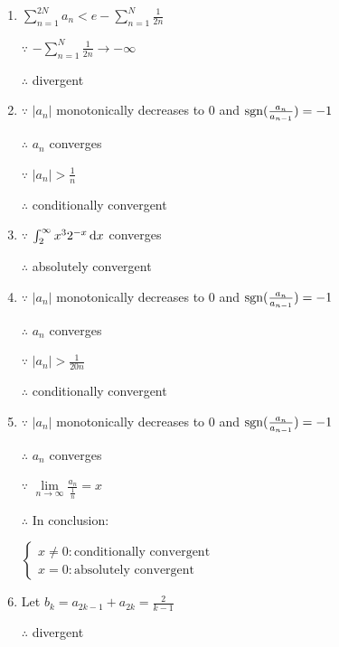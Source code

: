 \begin{enumerate}[1]
\begin{enumerate}[(1)]
     \item
     $\sum\limits_{n=1}^{2N}a_n < e-\sum\limits_{n=1}^{N}\frac{1}{2n}$
     \par $\because$ $-\sum\limits_{n=1}^{N}\frac{1}{2n}\rightarrow -\infty$
     \par $\therefore$ divergent

     \item
     $\because$ $|a_n|$ monotonically decreases to $0$ and $\mathop{\mathrm{sgn}} (\frac{a_n}{a_{n-1}})=-1$
     \par $\therefore$ $a_n$ converges
     \par $\because$ $|a_n|>\frac{1}{n}$
     \par $\therefore$ conditionally convergent

     \item
     $\because$ $\int_{2}^{\infty}x^3 2^{-x}\dif x$ converges
     \par $\therefore$ absolutely convergent

     \item
     $\because$ $|a_n|$ monotonically decreases to $0$ and $\mathop{\mathrm{sgn}} (\frac{a_n}{a_{n-1}})=-1$
     \par $\therefore$ $a_n$ converges
     \par $\because$ $|a_n|>\frac{1}{20n}$
     \par $\therefore$ conditionally convergent

     \item
     $\because$ $|a_n|$ monotonically decreases to $0$ and $\mathop{\mathrm{sgn}} (\frac{a_n}{a_{n-1}})=-1$
     \par $\therefore$ $a_n$ converges
     \par $\because$ $\lim\limits_{n\rightarrow{\infty}}\frac{a_n}{\frac{1}{n}}=x$
     \par $\therefore$ In conclusion:
     \par $\begin{cases} 
      x \not= 0:\text{conditionally convergent}
      \\x = 0:\text{absolutely convergent}
      \end{cases}$

     \item
     Let $b_k=a_{2k-1}+a_{2k}=\frac{2}{k-1}$
     \par $\therefore$ divergent
   \end{enumerate}

   
   \end{enumerate}